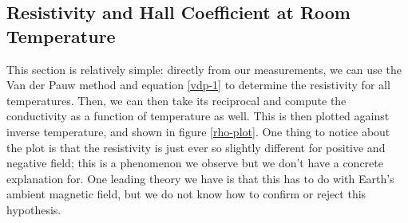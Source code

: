 \documentclass[10pt]{article}
\begin{document}
	\subsection{Resistivity and Hall Coefficient at Room Temperature}
	This section is relatively simple: directly from our measurements, we can use the Van der Pauw method and
	equation \ref{vdp-1} to determine the resistivity for all temperatures. Then, we can then take its
	reciprocal and compute the conductivity as a function of temperature as well. This is then plotted
	against inverse temperature, and shown in figure \ref{rho-plot}. One thing to notice about the plot is
	that the resistivity is just ever so slightly different for positive and negative field; this is a
	phenomenon we observe but we don't have a concrete explanation for. One leading theory we have is that
	this has to do with Earth's ambient magnetic field, but we do not know how to confirm or reject this
	hypothesis.   
\end{document}
